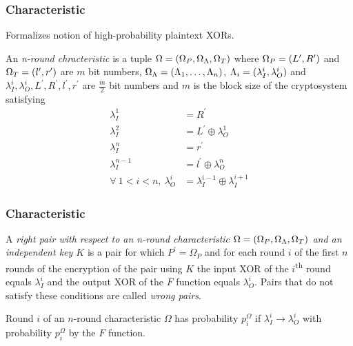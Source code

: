 \documentclass{beamer}
\begin{document}
	\begin{frame}
		\frametitle{Characteristic}
		Formalizes notion of high-probability plaintext XORs.
		\begin{definition}[Characteristic]
			An \emph{n-round chracteristic} is a tuple \(\Omega =
			(\Omega_P, \Omega_\Lambda, \Omega_T)\) where \(\Omega_P =
			(L^\prime, R^\prime)\) and \(\Omega_T = (l^\prime,
			r^\prime)\) are \(m\) bit numbers, \(\Omega_\Lambda =
			(\Lambda_1, \ldots, \Lambda_n)\), \(\Lambda_i =
			(\lambda_I^i, \lambda_O^i)\) and \(\lambda_I^i,
			\lambda_O^i, L^\prime, R^\prime, l^\prime, r^\prime\) are
			\(\frac{m}{2}\) bit numbers and \(m\) is the block size of the
			cryptosystem satisfying
			\begin{align}
				\lambda_I^1 &= R^\prime \\
				\lambda_I^2 &= L^\prime \oplus \lambda_O^1 \\
				\lambda_I^n &= r^\prime \\
				\lambda_I^{n-1} &= l^\prime \oplus \lambda_O^n \\
				\forall\ 1 < i < n,\ \lambda_O^i &= \lambda_I^{i-1} \oplus \lambda_I^{i+1}
				\label{eq:char-def}
			\end{align}
		\end{definition}
	\end{frame}

	\begin{frame}
		\frametitle{Characteristic}
		\begin{definition}
			A \emph{right pair with respect to an n-round characteristic
			\(\Omega = (\Omega_P, \Omega_\Lambda, \Omega_T)\) and an
			independent key \(K\)} is a pair for which \(P^\prime = \Omega_P\)
			and for each round \(i\) of the first \(n\) rounds of the encryption
			of the pair using \(K\) the input XOR of the
			\(i\)\textsuperscript{th} round equals \(\lambda_I^i\) and the
			output XOR of the \(F\) function equals \(\lambda_O^i\). Pairs that
			do not satisfy these conditions are called \emph{wrong pairs}.
		\end{definition}
		\pause
		\begin{definition}
			Round \(i\) of an \(n\)-round characteristic \(\Omega\) has
			probability \(p_i^\Omega\) if \(\lambda_I^i \rightarrow
			\lambda_O^i\) with probability \(p_i^\Omega\) by the \(F\) function.
		\end{definition}
	\end{frame}
\end{document}
